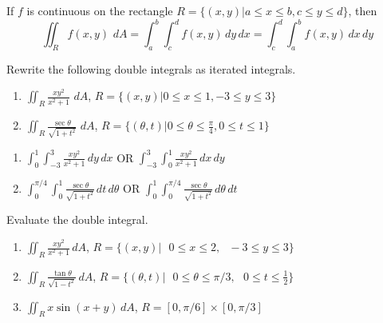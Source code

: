 \begin{mdframed}[style = important, frametitle = {Fubini's Theorem}]
If $f$ is continuous on the rectangle $R = \{ \left( x, y \right) | a \leq x 
\leq b, c \leq y \leq d \}$, then
$$\iint_R f(x,y)\,\,dA = \int_a^b \int_c^d f(x,y)\,dy\,dx = \int_c^d \int_a^b 
f(x,y)\,dx\,dy$$
\end{mdframed}

\begin{Exercise}[title={Applying Fubini's Theorem},label = fubini_1]
Rewrite the following double integrals as iterated integrals.
\begin{enumerate}
\item $\iint_R \frac{xy^2}{x^2 + 1}\,\,dA$, $R = \{(x,y)|0 \leq x \leq 1, -3 
\leq y \leq 3\}$
\item $\iint_R \frac{\sec{\theta}}{\sqrt{1 + t^2}}\,\,dA$, $R = \{(\theta, t) |
0 \leq \theta \leq \frac{\pi}{4}, 0 \leq t \leq 1 \}$
\end{enumerate}
\vspace{40mm}
\end{Exercise}

\begin{Answer}[ref = fubini_1]
\begin{enumerate}
\item $\int_0^1 \int_{-3}^3 \frac{xy^2}{x^2 + 1}\,dy\,dx$ OR $\int_{-3}^3 
\int_0^1 \frac{xy^2}{x^2 + 1}\,dx\,dy$
\item $\int_0^{\pi/4} \int_0^1 \frac{\sec{\theta}}{\sqrt{1 + t^2}}\,dt\,
d\theta$ OR $\int_0^1 \int_0^{\pi/4} \frac{\sec{\theta}}{\sqrt{1 + t^2}}\,
d\theta \,dt$
\end{enumerate}
\end{Answer}

\begin{Exercise}[label = fubini_2]
Evaluate the double integral. 
\begin{enumerate}
\item $\iint_R \frac{xy^2}{x^2 + 1}\,dA$, $\textit{R} = \{ \left( x, y \right) 
| \text{ } 0 \leq x \leq 2, \text{ } -3 \leq y \leq 3 \}$
\item $\iint_R \frac{\tan{\theta}}{\sqrt{1 - t^2}}\,dA$, $\textit{R} = \{ 
\left( \theta, t \right) | \text{ } 0 \leq \theta \leq \pi/3, \text{ } 0 \leq 
t \leq \frac{1}{2} \}$
\item $\iint_R x \sin{ \left( x + y \right) }\,dA$, $\textit{R} = \left[0, 
\pi/6 \right] \times \left[ 0, \pi/3 \right]$
\end{enumerate}
\end{Exercise}

